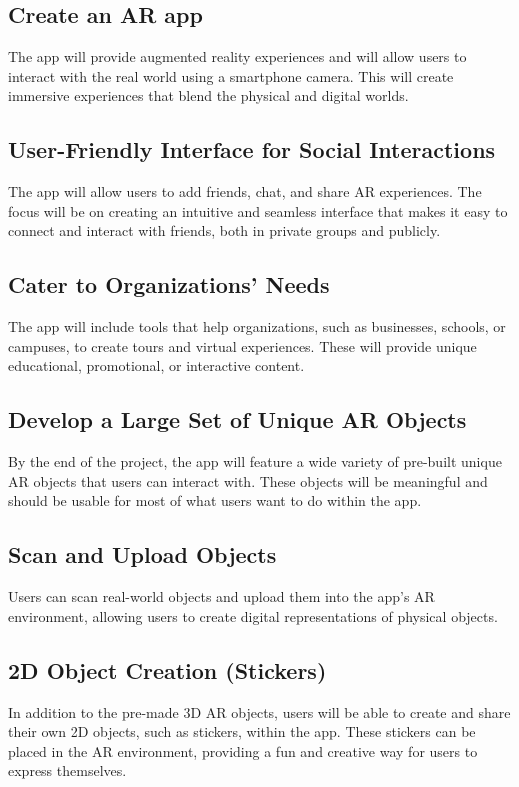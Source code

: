 \documentclass{article}
\begin{document}
\subsection{Create an AR app}
The app will provide augmented reality experiences and will allow users to interact with the real world using a smartphone camera. This will create immersive experiences that blend the physical and digital worlds.

\subsection{User-Friendly Interface for Social Interactions}
The app will allow users to add friends, chat, and share AR experiences. The focus will be on creating an intuitive and seamless interface that makes it easy to connect and interact with friends, both in private groups and publicly.

\subsection{Cater to Organizations’ Needs}
The app will include tools that help organizations, such as businesses, schools, or campuses, to create tours and virtual experiences. These will provide unique educational, promotional, or interactive content.

\subsection{Develop a Large Set of Unique AR Objects}
By the end of the project, the app will feature a wide variety of pre-built unique AR objects that users can interact with. These objects will be meaningful and should be usable for most of what users want to do within the app.

\subsection{Scan and Upload Objects}
Users can scan real-world objects and upload them into the app’s AR environment, allowing users to create digital representations of physical objects.

\subsection{2D Object Creation (Stickers)}
In addition to the pre-made 3D AR objects, users will be able to create and share their own 2D objects, such as stickers, within the app. These stickers can be placed in the AR environment, providing a fun and creative way for users to express themselves.
\end{document}
